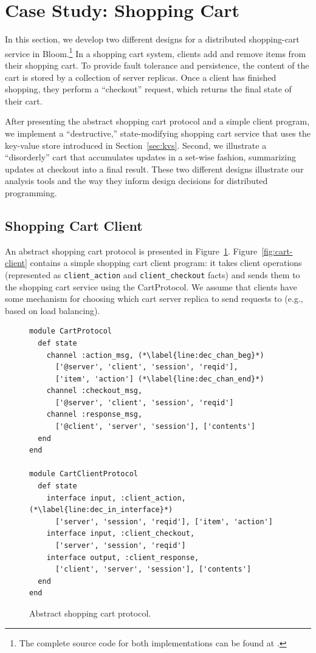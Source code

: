 \section{Case Study: Shopping Cart}
\label{sec:case}
In this section, we develop two different designs for a distributed
shopping-cart service in Bloom.\footnote{The complete source code for both
  implementations can be found at
  .}  In a
shopping cart system, clients add and remove items from their shopping cart. To
provide fault tolerance and persistence, the content of the cart is stored by a
collection of server replicas. Once a client has finished shopping, they perform
a ``checkout'' request, which returns the final state of their cart.

After presenting the abstract shopping cart protocol and a simple client
program, we implement a ``destructive,'' state-modifying shopping cart service
that uses the key-value store introduced in Section~\ref{sec:kvs}. Second, we
illustrate a ``disorderly'' cart that accumulates updates in a set-wise fashion,
summarizing updates at checkout into a final result.  These two different
designs illustrate our analysis tools and the way they inform design decisions
for distributed programming.

\subsection{Shopping Cart Client}
An abstract shopping cart protocol is presented in
Figure~\ref{fig:cart-protocol}. Figure~\ref{fig:cart-client} contains a simple
shopping cart client program: it takes client operations (represented as
\texttt{client\_action} and \texttt{client\_checkout} facts) and sends them to
the shopping cart service using the CartProtocol. We assume that clients have
some mechanism for choosing which cart server replica to send requests to (e.g.,
based on load balancing).

\begin{figure}[t]
\begin{scriptsize}
\begin{lstlisting}
module CartProtocol
  def state
    channel :action_msg, (*\label{line:dec_chan_beg}*)
      ['@server', 'client', 'session', 'reqid'],
      ['item', 'action'] (*\label{line:dec_chan_end}*)
    channel :checkout_msg,
      ['@server', 'client', 'session', 'reqid']
    channel :response_msg,
      ['@client', 'server', 'session'], ['contents']
  end
end

module CartClientProtocol
  def state
    interface input, :client_action, (*\label{line:dec_in_interface}*)
      ['server', 'session', 'reqid'], ['item', 'action'] 
    interface input, :client_checkout,
      ['server', 'session', 'reqid']
    interface output, :client_response, 
      ['client', 'server', 'session'], ['contents']
  end
end
\end{lstlisting}
\vspace{-10pt}
\caption{Abstract shopping cart protocol.}
\label{fig:cart-protocol}
\end{scriptsize}
\vspace{-2pt}
\end{figure}

